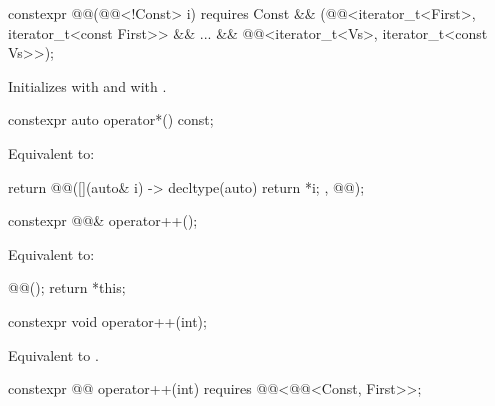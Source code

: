 %
\begin{itemdecl}
constexpr @@(@@<!Const> i) requires Const &&
  (@@<iterator_t<First>, iterator_t<const First>> &&
    ... && @@<iterator_t<Vs>, iterator_t<const Vs>>);
\end{itemdecl}

\begin{itemdescr}
\pnum
\effects
Initializes
 with  and
 with .
\end{itemdescr}

%
\begin{itemdecl}
constexpr auto operator*() const;
\end{itemdecl}

\begin{itemdescr}
\pnum
\effects
Equivalent to:
\begin{codeblock}
return @@([](auto& i) -> decltype(auto) { return *i; }, @@);
\end{codeblock}
\end{itemdescr}

%
\begin{itemdecl}
constexpr @@& operator++();
\end{itemdecl}

\begin{itemdescr}
\pnum
\effects
Equivalent to:
\begin{codeblock}
@@();
return *this;
\end{codeblock}
\end{itemdescr}

%
\begin{itemdecl}
constexpr void operator++(int);
\end{itemdecl}

\begin{itemdescr}
\pnum
\effects
Equivalent to .
\end{itemdescr}

%
\begin{itemdecl}
constexpr @@ operator++(int) requires @@<@@<Const, First>>;
\end{itemdecl}

